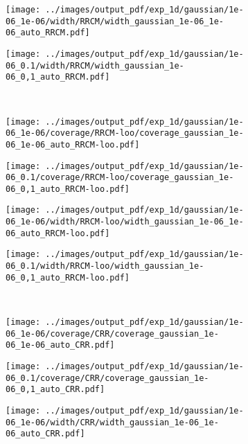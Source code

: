 \documentclass[10pt, conference, compsocconf]{IEEEtran}
\begin{document}
\begin{figure}
  \begin{subfigure}[b]{0.25\linewidth}
    \texttt{[image: ../images/output\_pdf/exp\_1d/gaussian/1e-06\_1e-06/width/RRCM/width\_gaussian\_1e-06\_1e-06\_auto\_RRCM.pdf]}
  \end{subfigure}%
  \begin{subfigure}[b]{0.25\linewidth}
    \texttt{[image: ../images/output\_pdf/exp\_1d/gaussian/1e-06\_0.1/width/RRCM/width\_gaussian\_1e-06\_0,1\_auto\_RRCM.pdf]}
  \end{subfigure}\\
  \begin{subfigure}[b]{0.25\linewidth}
    \texttt{[image: ../images/output\_pdf/exp\_1d/gaussian/1e-06\_1e-06/coverage/RRCM-loo/coverage\_gaussian\_1e-06\_1e-06\_auto\_RRCM-loo.pdf]}
  \end{subfigure}%
  \begin{subfigure}[b]{0.25\linewidth}
    \texttt{[image: ../images/output\_pdf/exp\_1d/gaussian/1e-06\_0.1/coverage/RRCM-loo/coverage\_gaussian\_1e-06\_0,1\_auto\_RRCM-loo.pdf]}
  \end{subfigure}%
  \begin{subfigure}[b]{0.25\linewidth}
    \texttt{[image: ../images/output\_pdf/exp\_1d/gaussian/1e-06\_1e-06/width/RRCM-loo/width\_gaussian\_1e-06\_1e-06\_auto\_RRCM-loo.pdf]}
  \end{subfigure}%
  \begin{subfigure}[b]{0.25\linewidth}
    \texttt{[image: ../images/output\_pdf/exp\_1d/gaussian/1e-06\_0.1/width/RRCM-loo/width\_gaussian\_1e-06\_0,1\_auto\_RRCM-loo.pdf]}
  \end{subfigure}\\
  \begin{subfigure}[b]{0.25\linewidth}
    \texttt{[image: ../images/output\_pdf/exp\_1d/gaussian/1e-06\_1e-06/coverage/CRR/coverage\_gaussian\_1e-06\_1e-06\_auto\_CRR.pdf]}
  \end{subfigure}%
  \begin{subfigure}[b]{0.25\linewidth}
    \texttt{[image: ../images/output\_pdf/exp\_1d/gaussian/1e-06\_0.1/coverage/CRR/coverage\_gaussian\_1e-06\_0,1\_auto\_CRR.pdf]}
  \end{subfigure}%
  \begin{subfigure}[b]{0.25\linewidth}
    \texttt{[image: ../images/output\_pdf/exp\_1d/gaussian/1e-06\_1e-06/width/CRR/width\_gaussian\_1e-06\_1e-06\_auto\_CRR.pdf]}

\end{subfigure}
\end{figure}
\end{document}

